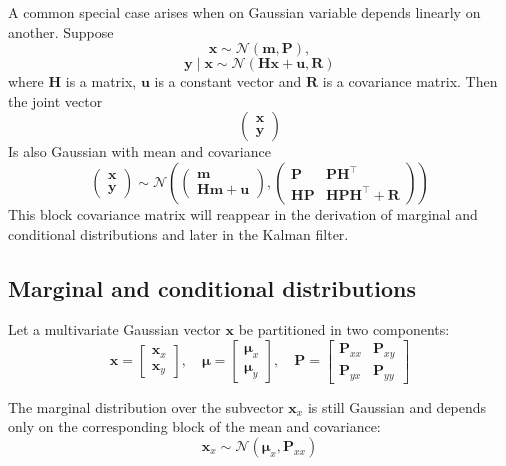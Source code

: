 A common special case arises when on Gaussian variable depends linearly on another. Suppose
\[
\mathbf{x} \sim \mathcal{N}(\mathbf{m}, \mathbf{P}), 
\]
\[
\mathbf{y} \mid \mathbf{x} \sim \mathcal{N}(\mathbf{H}\mathbf{x}+\mathbf{u}, \mathbf{R})
\]
where $\mathbf{H}$ is a matrix, $\mathbf{u}$ is a constant vector and $\mathbf{R}$ is a covariance matrix. Then the joint vector
\[
\begin{pmatrix}
    \mathbf{x} \\ \mathbf{y} 
\end{pmatrix} 
\]
Is also Gaussian with mean and covariance
\[
\begin{pmatrix}
    \mathbf{x} \\ \mathbf{y} 
\end{pmatrix} 
    \sim \mathcal{N}\!\left(
    \begin{pmatrix}
        \mathbf{m} \\ 
        \mathbf{H}\mathbf{m} + \mathbf{u}
    \end{pmatrix},
    \begin{pmatrix}
        \mathbf{P} & \mathbf{P}\mathbf{H^\top} \\
        \mathbf{H}\mathbf{P} & \mathbf{H}\mathbf{P}\mathbf{H^\top} +\mathbf{R}
    \end{pmatrix}\right)
\]
This block covariance matrix will reappear in the derivation of marginal and conditional distributions and later in the Kalman filter. 

\subsection*{Marginal and conditional distributions}
Let a multivariate Gaussian vector $\mathbf{x}$ be partitioned in two components: 
\[
\mathbf{x} = 
\begin{bmatrix}
    \mathbf{x}_x \\
    \mathbf{x}_y
\end{bmatrix},
\quad
\boldsymbol{\mu} = 
\begin{bmatrix}
    \boldsymbol{\mu}_x \\
    \boldsymbol{\mu}_y
\end{bmatrix},
\quad
\mathbf{P} = 
\begin{bmatrix}
    \mathbf{P}_{xx} & \mathbf{P}_{xy} \\
    \mathbf{P}_{yx} & \mathbf{P}_{yy}
\end{bmatrix}
\]

The marginal distribution over the subvector $\mathbf{x}_x$ is still Gaussian and depends only on the corresponding block of the mean and covariance: 
\[
\mathbf{x}_x \sim \mathcal{N}(\boldsymbol{\mu}_x, \mathbf{P}_{xx})
\]

